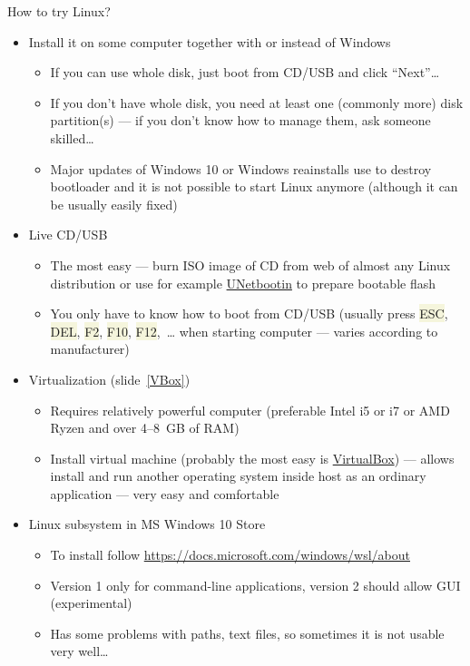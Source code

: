 \documentclass[compress, ucs, xelatex, 11pt, xcolor=svgnames, aspectratio=169,
	hyperref={
		bookmarks=true,
		unicode=true,
		colorlinks=true,
		pdftitle={Linux, command line and MetaCentrum},
		plainpages=false,
		pdfauthor={Vojtech Zeisek},
		pdfsubject={Course about use of Linux command line, writing shell scripts and using MetaCentrum of CESNET},
		pdfcreator={XeLaTeX},
		pdfkeywords={Linux, GNU, BASH, shell, command line, MetaCentrum},
		linkcolor=DarkRed, %
		anchorcolor=DarkBlue, %
		citecolor=Indigo, %
		filecolor=NavyBlue, %
		menucolor=DarkMagenta, %
		urlcolor=DarkBlue, %
		pdftex},
	url={hyphens, lowtilde} %
	]{beamer}
\renewcommand{\texttt}[1]{\colorbox{Beige}{{\ttfamily #1}}}
\begin{document}
\begin{frame}[allowframebreaks]{How to try Linux?}
	\begin{itemize}
		\item Install it on some computer together with or instead of Windows
		\begin{itemize}
			\item If you can use whole disk, just boot from CD/USB and click \enquote{Next}\ldots
			\item If you don't have whole disk, you need at least one (commonly more) disk partition(s) --- if you don't know how to manage them, ask someone skilled\ldots
			\item Major updates of Windows 10 or Windows reainstalls use to destroy bootloader and it is not possible to start Linux anymore (although it can be usually easily fixed)
		\end{itemize}
		\item Live CD/USB
		\begin{itemize}
			\item The most easy --- burn ISO image of CD from web of almost any Linux distribution or use for example \href{https://unetbootin.github.io/}{UNetbootin} to prepare bootable flash
			\item You only have to know how to boot from CD/USB (usually press \texttt{ESC}, \texttt{DEL}, \texttt{F2}, \texttt{F10}, \texttt{F12},~\ldots{ }when starting computer --- varies according to manufacturer)
		\end{itemize}
		\item Virtualization (slide~\ref{VBox})
		\begin{itemize}
			\item Requires relatively powerful computer (preferable Intel i5 or i7 or AMD Ryzen and over 4--8~GB of RAM)
			\item Install virtual machine (probably the most easy is \href{https://www.virtualbox.org/}{VirtualBox}) --- allows install and run another operating system inside host as an ordinary application --- very easy and comfortable
		\end{itemize}
		\item Linux subsystem in MS Windows 10 Store
		\begin{itemize}
			\item To install follow \url{https://docs.microsoft.com/windows/wsl/about}
			\item Version 1 only for command-line applications, version 2 should allow GUI (experimental)
			\item Has some problems with paths, text files, so sometimes it is not usable very well\ldots

\end{itemize}
\end{itemize}
\end{frame}
\end{document}
